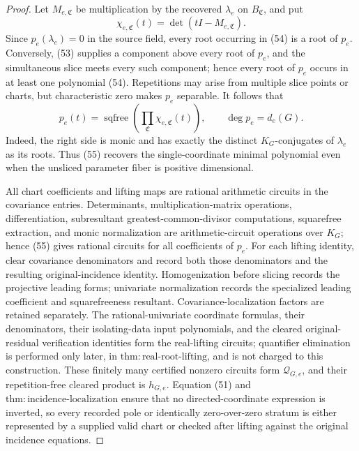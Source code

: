 \documentclass{article}
\begin{document}
\begin{proof}
Let \(M_{e,\mathfrak C}\) be multiplication by the recovered \(\lambda_e\) on \(B_{\mathfrak C}\), and put
\[
 \chi_{e,\mathfrak C}(t)=\det(tI-M_{e,\mathfrak C}).
\tag{54}
\]
Since \(p_e(\lambda_e)=0\) in the source field, every root occurring in (54) is a root of \(p_e\).  Conversely, (53) supplies a component above every root of \(p_e\), and the simultaneous slice meets every such component; hence every root of \(p_e\) occurs in at least one polynomial (54).  Repetitions may arise from multiple slice points or charts, but characteristic zero makes \(p_e\) separable.  It follows that
\[
 p_e(t)=\operatorname{sqfree}\!\left(
   \prod_{\mathfrak C}\chi_{e,\mathfrak C}(t)
 \right),
 \qquad \deg p_e=d_e(G).
\tag{55}
\]
Indeed, the right side is monic and has exactly the distinct \(K_G\)-conjugates of \(\lambda_e\) as its roots.  Thus (55) recovers the single-coordinate minimal polynomial even when the unsliced parameter fiber is positive dimensional.

All chart coefficients and lifting maps are rational arithmetic circuits in the covariance entries.  Determinants, multiplication-matrix operations, differentiation, subresultant greatest-common-divisor computations, squarefree extraction, and monic normalization are arithmetic-circuit operations over \(K_G\); hence (55) gives rational circuits for all coefficients of \(p_e\).  For each lifting identity, clear covariance denominators and record both those denominators and the resulting original-incidence identity.  Homogenization before slicing records the projective leading forms; univariate normalization records the specialized leading coefficient and squarefreeness resultant.  Covariance-localization factors are retained separately.  The rational-univariate coordinate formulas, their denominators, their isolating-data input polynomials, and the cleared original-residual verification identities form the real-lifting circuits; quantifier elimination is performed only later, in \(\mathrm{thm:real\mbox{-}root\mbox{-}lifting}\), and is not charged to this construction.  These finitely many certified nonzero circuits form \(\mathcal Q_{G,e}\), and their repetition-free cleared product is \(h_{G,e}\).  Equation (51) and \(\mathrm{thm:incidence\mbox{-}localization}\) ensure that no directed-coordinate expression is inverted, so every recorded pole or identically zero-over-zero stratum is either represented by a supplied valid chart or checked after lifting against the original incidence equations.


\end{proof}
\end{document}
